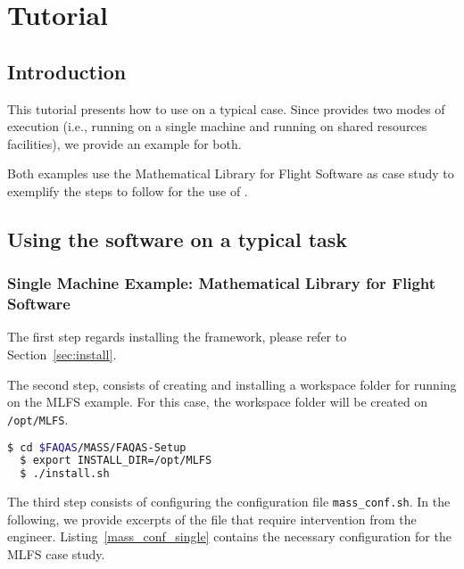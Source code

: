 
\chapter{Tutorial}

\section{Introduction}

This tutorial presents how to use \MASS on a typical case. Since \MASS provides two modes of execution (i.e., running \MASS on a single machine and running \MASS on shared resources facilities), we provide an example for both.

Both examples use the Mathematical Library for Flight Software as case study to exemplify the steps to follow for the use of \FAQAS.



\section{Using the software on a typical task}

\subsection{Single Machine Example: Mathematical Library for Flight Software}
\label{sec:single_machine}

The first step regards installing the \MASS framework, please refer to Section~\ref{sec:install}.

The second step, consists of creating and installing a workspace folder for running \MASS on the MLFS example. For this case, the workspace folder will be created on \texttt{/opt/MLFS}.

\begin{lstlisting}[language=bash]
  $ cd $FAQAS/MASS/FAQAS-Setup
  $ export INSTALL_DIR=/opt/MLFS
  $ ./install.sh
\end{lstlisting}

The third step consists of configuring the \MASS configuration file \texttt{mass\_conf.sh}. In the following, we provide excerpts of the file that require intervention from the engineer. Listing~\ref{mass_conf_single} contains the necessary configuration for the MLFS case study.

